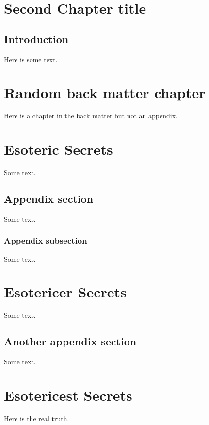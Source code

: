 \documentclass{amsbook}
\begin{document}
\chapter{Second Chapter title}

\section{Introduction}

Here is some text.

\backmatter

\chapter{Random back matter chapter}

Here is a chapter in the back matter but not an appendix.

\appendix[Appendixes]

\chapter{Esoteric Secrets}

Some text.

\section{Appendix section}

Some text.

\subsection{Appendix subsection}

Some text.

\chapter*{Esotericer Secrets}

Some text.

\section{Another appendix section}

Some text.

\chapter{Esotericest Secrets}

Here is the real truth.

\end{document}
